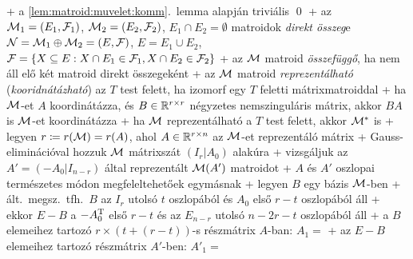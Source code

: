   + \proof a \ref{lem:matroid:muvelet:komm}.~lemma alapján triviális
    \qed
+ \dfn az $\mathcal{M}_1 = (E_1, \mathcal{F}_1)$, $\mathcal{M}_2 = (E_2, \mathcal{F}_2)$, $E_1 \cap
  E_2 = \emptyset$ matroidok \emph{direkt összeg}e $\mathcal{N} = \mathcal{M}_1 \oplus
  \mathcal{M}_2 = (E, \mathcal{F})$, $E = E_1 \cup E_2$, $\mathcal{F} = \{ X \subseteq E : X
  \cap E_1 \in \mathcal{F}_1, X \cap E_2 \in \mathcal{F}_2 \}$
+ \dfn az $\mathcal{M}$ matroid \emph{összefüggő}, ha nem áll elő két matroid
  direkt összegeként
+ \dfn az $\mathcal{M}$ matroid \emph{reprezentálható}
  (\emph{kooridnátázható}) az $T$ test felett, ha izomorf egy $T$
  feletti mátrixmatroiddal
  + ha $\mathcal{M}$-et $A$ koordinátázza, és $B \in \mathbb{R}^{r \times r}$
    négyzetes nemszinguláris mátrix, akkor $BA$ is $\mathcal{M}$-et
    koordinátázza
+ \thm \label{thm:matroid:muvelet:dualrep}ha $\mathcal{M}$ reprezentálható a $T$ test felett, akkor $\mathcal{M}^*$ is
  + \proof legyen $r \coloneqq r(\mathcal{M}) = r(A)$, ahol $A \in \mathbb{R}^{r
    \times n}$ az $\mathcal{M}$-et reprezentáló mátrix
    + Gauss-eliminációval hozzuk $\mathcal{M}$ mátrixszát $(I_r | A_0)$
      alakúra
  + vizsgáljuk az $A' = (-A_0 | I_{n - r})$ által reprezentált
    $\mathcal{M}(A')$ matroidot
    + $A$ és $A'$ oszlopai természetes módon megfeleltehetőek egymásnak
    + legyen $B$ egy bázis $\mathcal{M}$-ben
      + ált.~megsz.~tfh.~$B$ az $I_r$ utolsó $t$ oszlopából és $A_0$
        első $r - t$ oszlopából áll
      + ekkor $E - B$ a $-A_0^{\mathrm{T}}$ első $r - t$ és az $E_{n - r}$
        utolsó $n - 2r - t$ oszlopából áll
      + a $B$ elemeihez tartozó $r \times (t + (r - t))$-s részmátrix $A$-ban: $A_1 =$
      + az $E - B$ elemeihez tartozó részmátrix $A'$-ben: $A'_1 =$
